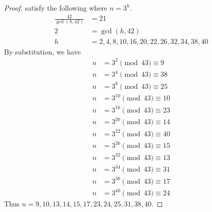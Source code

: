 \documentclass[11pt]{article}
\theoremstyle{definition}
\begin{document}
\begin{enumerate}
\begin{enumerate}
\begin{proof}
            satisfy the following where $n=3^h$.
            \begin{align*}
                \frac{42}{\gcd(h,42)} &= 21 \\
                2 &= \gcd(h,42) \\
                h &= 2,4,8,10,16,20,22,26,32,34,38,40
            \end{align*}
            By substitution, we have
            \begin{align*}
                n &= 3^2\pmod{43}\equiv 9 \\
                n &= 3^4\pmod{43}\equiv 38 \\
                n &= 3^8\pmod{43}\equiv 25 \\
                n &= 3^{10}\pmod{43}\equiv 10 \\
                n &= 3^{16}\pmod{43}\equiv 23 \\
                n &= 3^{20}\pmod{43}\equiv 14 \\
                n &= 3^{22}\pmod{43}\equiv 40 \\
                n &= 3^{26}\pmod{43}\equiv 15 \\
                n &= 3^{32}\pmod{43}\equiv 13 \\
                n &= 3^{34}\pmod{43}\equiv 31 \\
                n &= 3^{38}\pmod{43}\equiv 17 \\
                n &= 3^{40}\pmod{43}\equiv 24
            \end{align*}
            Thus $n=9,10,13,14,15,17,23,24,25,31,38,40$.
        \end{proof}
        

\end{enumerate}
\end{enumerate}
\end{document}
